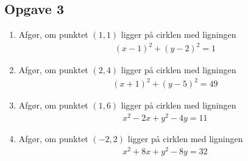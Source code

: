 \subsection*{Opgave 3}

\begin{enumerate}[label=\roman*)]
	\item Afgør, om punktet $(1,1)$ ligger på cirklen med ligningen
	\begin{align*}
		(x-1)^2 +(y-2)^2 = 1 
	\end{align*}
	\item Afgør, om punktet $(2,4)$ ligger på cirklen med ligningen
	\begin{align*}
		(x+1)^2 + (y-5)^2 = 49
	\end{align*}
	\item Afgør, om punktet $(1,6)$ ligger på cirklen med ligningen 
	\begin{align*}
		x^2-2x+y^2-4y=11
	\end{align*}
	\item Afgør, om punktet $(-2,2)$ ligger på cirklen med ligningen
	\begin{align*}
		x^2+8x+y^2-8y=32
	\end{align*}
\end{enumerate}


